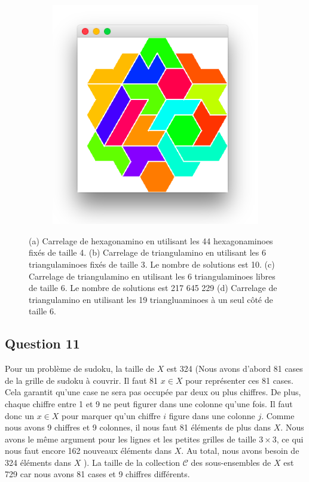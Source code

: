 \documentclass[a4paper,12pt]{article}
\begin{document}
\begin{figure}[h!]
\begin{subfigure}{0.3\textwidth}
		\includegraphics[width=\textwidth]{figures/task10_4.png}
		\caption{}
	\end{subfigure}
	\caption{\label{fig:task10}(a) Carrelage de hexagonamino en utilisant les 44 hexagonaminoes fixés de taille 4. (b) Carrelage de triangulamino en utilisant les 6 triangulaminoes fixés de taille 3. Le nombre de solutions est 10. (c) Carrelage de triangulamino en utilisant les 6 triangulaminoes libres de taille 6. Le nombre de solutions est 217 645 229 (d) Carrelage de triangulamino en utilisant les 19 triangluaminoes à un seul côté de taille 6.}
\end{figure}

\subsection{Question 11}
Pour un problème de sudoku, la taille de $X$ est 324 (Nous avons d'abord 81 cases de la grille de sudoku à couvrir. Il faut 81 $x\in X$ pour représenter ces 81 cases. Cela garantit qu'une case ne sera pas occupée par deux ou plus chiffres. De plus, chaque chiffre entre 1 et 9 ne peut figurer dans une colonne qu'une fois. Il faut donc un $x\in X$ pour marquer qu'un chiffre $i$ figure dans une colonne $j$. Comme nous avons 9 chiffres et 9 colonnes, il nous faut 81 éléments de plus dans $X$. Nous avons le même argument pour les lignes et les petites grilles de taille $3\times3$, ce qui nous faut encore 162 nouveaux éléments dans $X$. Au total, nous avons besoin de 324 éléments dans $X$ ). La taille de la collection $\mathcal{C}$ des sous-ensembles de $X$ est 729 car nous avons 81 cases et 9 chiffres différents.
\end{document}
